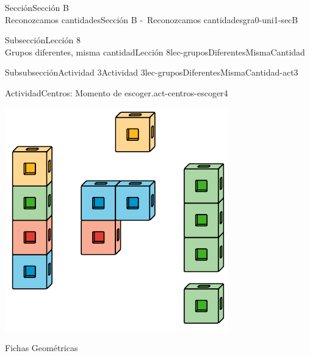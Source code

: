 \begin{sectionptx}{Sección}{{\Large Sección B\\}Reconozcamos cantidades}{}{Sección B -~Reconozcamos cantidades}{}{}{gra0-uni1-secB}
\begin{subsectionptx}{Subsección}{{\normalsize Lección 8\\[-0.05cm]}Grupos diferentes, misma cantidad}{}{Lección 8}{}{}{lec-gruposDiferentesMismaCantidad}
\begin{subsubsectionptx}{Subsubsección}{Actividad 3}{}{Actividad 3}{}{}{lec-gruposDiferentesMismaCantidad-act3}
\begin{activity}{Actividad}{Centros: Momento de escoger.}{act-centros-escoger4}
\begin{sidebyside}{2}{0.025}{0.025}{0.05}
\begin{sbspanel}{0.45}
\includegraphics[max width=\linewidth, center]{external/svg-source/tikz-file-128850.pdf}
\end{sbspanel}%
\begin{sbspanel}{0.45}%
Fichas Geométricas%
\par

\end{sbspanel}
\end{sidebyside}
\end{activity}
\end{subsubsectionptx}
\end{subsectionptx}
\end{sectionptx}
